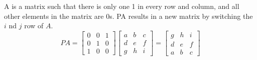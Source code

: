 \documentclass[12pt]{scrartcl}
\begin{document}
\begin{definition}
  A  is a matrix such that there is only one 1 in every row and column, and 
  all other elements in the matrix are $0$s. PA results in a new matrix by switching the $i$ nd $j$ row of $A$. 
  \[PA = \begin{bmatrix}
    0 & 0 & 1\\
    0 & 1 & 0\\
    1 & 0 & 0
  \end{bmatrix}\begin{bmatrix}
    a & b & c\\ d & e & f\\ g & h & i
  \end{bmatrix} = \begin{bmatrix}
    g & h & i\\
    d & e & f\\
    a & b & c
  \end{bmatrix}\]
\end{definition}
\end{document}
